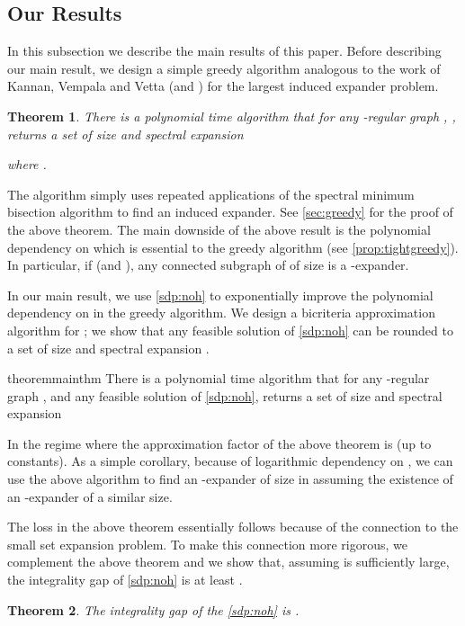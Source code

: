 \documentclass[11pt]{article}
\newtheorem{theorem}{Theorem}[section]
\begin{document}
\subsection{Our Results}
\label{subsec:ourresults}
In this subsection we describe the main results of this paper. 
Before describing our main result, we design a simple greedy algorithm analogous to the work of Kannan, Vempala and Vetta \cite{KVV04} (and \cite{Tre05,AO14}) for the largest induced expander problem. 
\begin{theorem}
\label{thm:greedy}
There is a polynomial time algorithm that for any -regular graph , , returns a set  of size  and spectral expansion 

where .
\end{theorem}
The algorithm simply uses repeated applications of the spectral minimum bisection algorithm to find an induced expander. See \autoref{sec:greedy} for the proof of the above theorem. The main downside of the above result is the polynomial dependency on  which is essential to the greedy algorithm (see \autoref{prop:tightgreedy}). 
In particular, if  (and ), any connected subgraph of  of size  is a -expander.

In our main result, we use \ref{sdp:noh} to exponentially improve the polynomial dependency on  in the greedy algorithm. 
We design a bicriteria approximation algorithm for ; we show that any feasible solution of \ref{sdp:noh} can be rounded to a set of size  and spectral expansion .

\begin{restatable}{theorem}{mainthm}
\label{thm:maintheoremwithoutoutsideexpansion}
There is a polynomial time algorithm that for any -regular graph ,  and any feasible solution  of \ref{sdp:noh},
 returns a set  of size  and spectral expansion
 
\end{restatable}
In the regime where  the approximation factor of the above theorem is  (up to constants).
As a simple corollary, because of logarithmic dependency on , we can use the above algorithm to find an -expander of size  in  assuming the existence of an -expander of a similar size.

The  loss in the above theorem essentially follows because of the connection to the small set expansion problem.
To make this connection more rigorous, we complement the above theorem and we show that, assuming  is sufficiently large, 
 the integrality gap of \ref{sdp:noh} is at least .
\begin{theorem}
\label{thm:IG1}
The integrality gap of the \ref{sdp:noh} is .
\end{theorem}
\end{document}
